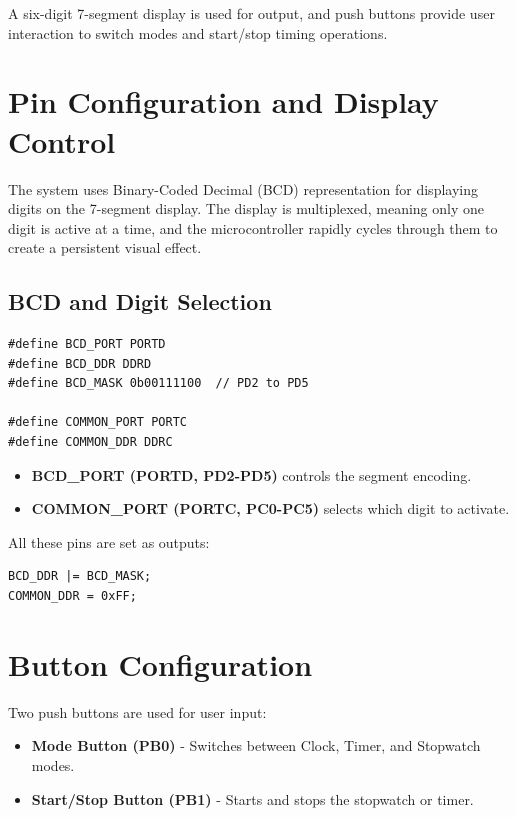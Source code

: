 \documentclass[a4paper,12pt]{article}
\begin{document}
A six-digit 7-segment display is used for output, and push buttons provide user interaction to switch modes and start/stop timing operations.

\section*{Pin Configuration and Display Control}

The system uses Binary-Coded Decimal (BCD) representation for displaying digits on the 7-segment display. The display is multiplexed, meaning only one digit is active at a time, and the microcontroller rapidly cycles through them to create a persistent visual effect.
\subsection*{BCD and Digit Selection}

\begin{lstlisting}
#define BCD_PORT PORTD
#define BCD_DDR DDRD
#define BCD_MASK 0b00111100  // PD2 to PD5

#define COMMON_PORT PORTC
#define COMMON_DDR DDRC
\end{lstlisting}

\begin{itemize}
    \item \textbf{BCD\_PORT (PORTD, PD2-PD5)} controls the segment encoding.
    \item \textbf{COMMON\_PORT (PORTC, PC0-PC5)} selects which digit to activate.
\end{itemize}

All these pins are set as outputs:

\begin{lstlisting}
BCD_DDR |= BCD_MASK;
COMMON_DDR = 0xFF;
\end{lstlisting}

\section*{Button Configuration}

Two push buttons are used for user input:

\begin{itemize}
    \item \textbf{Mode Button (PB0)} - Switches between Clock, Timer, and Stopwatch modes.
    \item \textbf{Start/Stop Button (PB1)} - Starts and stops the stopwatch or timer.
\end{itemize}
\end{document}
